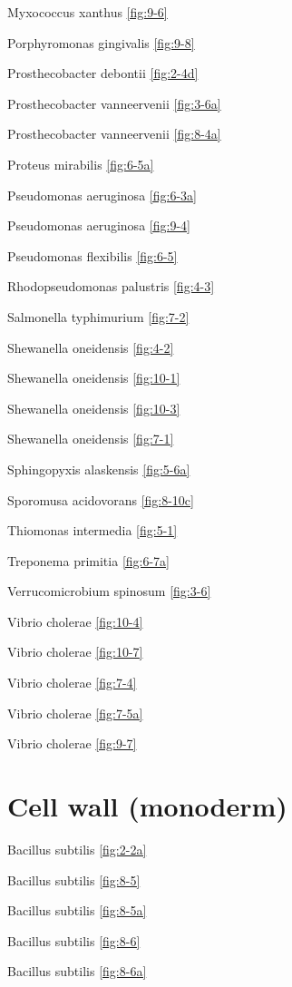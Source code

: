 \documentclass[]{tufte-book}
\begin{document}
Myxococcus xanthus \ref{fig:9-6}

Porphyromonas gingivalis \ref{fig:9-8}

Prosthecobacter debontii \ref{fig:2-4d}

Prosthecobacter vanneervenii \ref{fig:3-6a}

Prosthecobacter vanneervenii \ref{fig:8-4a}

Proteus mirabilis \ref{fig:6-5a}

Pseudomonas aeruginosa \ref{fig:6-3a}

Pseudomonas aeruginosa \ref{fig:9-4}

Pseudomonas flexibilis \ref{fig:6-5}

Rhodopseudomonas palustris \ref{fig:4-3}

Salmonella typhimurium \ref{fig:7-2}

Shewanella oneidensis \ref{fig:4-2}

Shewanella oneidensis \ref{fig:10-1}

Shewanella oneidensis \ref{fig:10-3}

Shewanella oneidensis \ref{fig:7-1}

Sphingopyxis alaskensis \ref{fig:5-6a}

Sporomusa acidovorans \ref{fig:8-10c}

Thiomonas intermedia \ref{fig:5-1}

Treponema primitia \ref{fig:6-7a}

Verrucomicrobium spinosum \ref{fig:3-6}

Vibrio cholerae \ref{fig:10-4}

Vibrio cholerae \ref{fig:10-7}

Vibrio cholerae \ref{fig:7-4}

Vibrio cholerae \ref{fig:7-5a}

Vibrio cholerae \ref{fig:9-7}

\hypertarget{cell-wall-monoderm}{%
\section*{Cell wall (monoderm)}\label{cell-wall-monoderm}}

Bacillus subtilis \ref{fig:2-2a}

Bacillus subtilis \ref{fig:8-5}

Bacillus subtilis \ref{fig:8-5a}

Bacillus subtilis \ref{fig:8-6}

Bacillus subtilis \ref{fig:8-6a}
\end{document}
